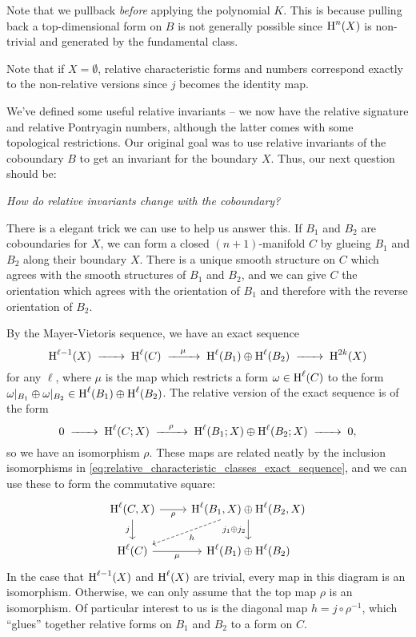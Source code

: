 \begin{remark}
	Note that we pullback \emph{before} applying the polynomial $K$. This is because pulling back a top-dimensional form on $B$ is not generally possible since $\operatorname{H}^{n}(X)$ is non-trivial and generated by the fundamental class.
\end{remark}

\begin{remark}
	Note that if $X=\emptyset$, relative characteristic forms and numbers correspond exactly to the non-relative versions since $j$ becomes the identity map.
\end{remark}

We've defined some useful relative invariants -- we now have the relative signature and relative Pontryagin numbers, although the latter comes with some topological restrictions. Our original goal was to use relative invariants of the coboundary $B$ to get an invariant for the boundary $X$. Thus, our next question should be:
\begin{center}
	\textsl{How do relative invariants change with the coboundary?}
\end{center}

There is a elegant trick we can use to help us answer this. If $B_1$ and $B_2$ are coboundaries for $X$, we can form a closed $(n+1)$-manifold $C$ by glueing $B_1$ and $B_2$ along their boundary $X$. There is a unique smooth structure on $C$ which agrees with the smooth structures of $B_1$ and $B_2$, and we can give $C$ the orientation which agrees with the orientation of $B_1$ and therefore with the reverse orientation of $B_2$.

By the Mayer-Vietoris sequence, we have an exact sequence
\[
	\H^{\ell-1}(X)\lkxto \H^{\ell}(C) \lkxto[\mu] \H^{\ell}(B_1)\oplus \H^{\ell}(B_2) \lkxto \H^{2k}(X)
\]
for any $\ell$, where $\mu$ is the map which restricts a form $\omega\in \operatorname{H}^\ell(C)$ to the form $\omega|_{B_1}\oplus \omega|_{B_2}\in \operatorname{H}^{\ell}(B_1)\oplus \operatorname{H}^{\ell}(B_2)$.
The relative version of the exact sequence is of the form
\[
	0 \lkxto \H^{\ell}(C; X) \lkxto[\rho] \H^{\ell}(B_1;X)\oplus \H^{\ell}(B_2;X) \lkxto 0,
\]
so we have an isomorphism $\rho$.
These maps are related neatly by the inclusion isomorphisms in \cref{eq:relative_characteristic_classes_exact_sequence}, and we can use these to form the commutative square:
\begin{equation}\label{eq:closing_coboundaries_square}
	\begin{tikzcd}
		{\H^{\ell}(C,X)} & {\H^{\ell}(B_1,X)\oplus\H^{\ell}(B_2,X)} \\
		{\H^{\ell}(C)} & {\H^{\ell}(B_1)\oplus\H^{\ell}(B_2)}
		\arrow["j_1\oplus j_2"', from=1-2, to=2-2]
		\arrow["\rho"', from=1-1, to=1-2]
		\arrow["j"', from=1-1, to=2-1]
		\arrow["\mu"', from=2-1, to=2-2]
		\arrow["h", from=1-2, to=2-1, dashed]
	\end{tikzcd}
\end{equation}
In the case that $\operatorname{H}^{\ell-1}(X)$ and $\operatorname{H}^\ell(X)$ are trivial, every map in this diagram is an isomorphism. Otherwise, we can only assume that the top map $\rho$ is an isomorphism.
Of particular interest to us is the diagonal map $h = j\circ \rho^{-1}$, which ``glues'' together relative forms on $B_1$ and $B_2$ to a form on $C$.

